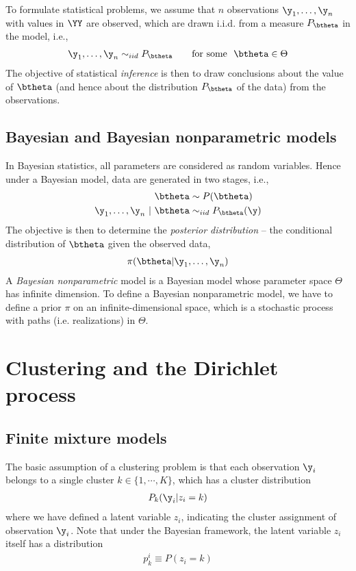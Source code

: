 \documentclass{article}
\begin{document}
To formulate statistical problems, we assume that $n$ observations $\y_1,\dots,\y_n$ with values in $\YY$ are observed, which are drawn i.i.d. from a measure $P_\btheta$ in the model, i.e.,
\begin{align}
\y_1, \dots, \y_n \sim_{iid} P_\btheta \qquad \text{for some}~~ \btheta \in \Theta
\end{align}
The objective of statistical {\em{inference}} is then to draw conclusions about the value of $\btheta$ (and hence about the distribution $P_\btheta$ of the data) from the observations.


\subsection{Bayesian and Bayesian nonparametric models}
In Bayesian statistics, all parameters are considered as random variables. Hence under a Bayesian model, data are generated in two stages, i.e.,
\begin{align}
\btheta &\sim P(\btheta)\\
\y_1, \dots, \y_n ~|~ \btheta &\sim_{iid} P_\btheta(\y)
\end{align}
The objective is then to determine the {\em{posterior distribution}} -- the conditional distribution of $\btheta$ given the observed data,
\begin{align}
\pi(\btheta | \y_1, \dots, \y_n)
\end{align}
A {\em{Bayesian nonparametric}} model is a Bayesian model whose parameter space $\Theta$ has infinite dimension. To define a Bayesian nonparametric model, we have to define a prior $\pi$ on an infinite-dimensional space, which is a stochastic process with paths (i.e. realizations) in $\Theta$.

\section{Clustering and the Dirichlet process}
\subsection{Finite mixture models}
The basic assumption of a clustering problem is that each observation $\y_i$ belongs to a single cluster $k \in \{1,\cdots, K\}$, which has a cluster distribution
\begin{align}
P_k(\y_i | z_i = k)
\end{align}
where we have defined a latent variable $z_i$, indicating the cluster assignment of observation $\y_i$. Note that under the Bayesian framework, the latent variable $z_i$ itself has a distribution
\begin{align}
p_k^i \equiv P(z_i = k)
\end{align}
\end{document}
